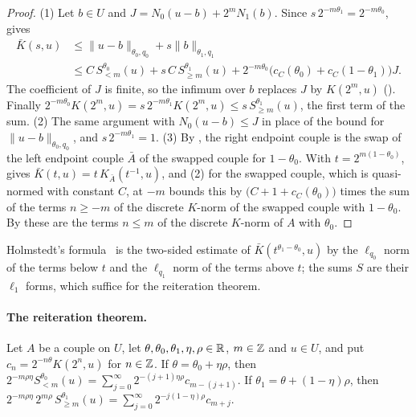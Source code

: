 \begin{proof}
\leanok
(1) Let $b \in U$ and $J = N_0(u - b) + 2^m N_1(b)$. Since $s \, 2^{-m\theta_1} =
2^{-m\theta_0}$,  gives
\begin{align*}
  \bar K(s, u) &\leq \|u - b\|_{\theta_0, q_0} + s \|b\|_{\theta_1, q_1} \\
  &\leq C \, S^{\theta_0}_{<m}(u) + s \, C \, S^{\theta_1}_{\geq m}(u)
    + 2^{-m\theta_0} \bigl(c_C(\theta_0) + c_C(1 - \theta_1)\bigr) J .
\end{align*}
The coefficient of $J$ is finite, so the infimum over $b$ replaces $J$ by $K(2^m, u)$
(). Finally
$2^{-m\theta_0} K(2^m, u) = s \, 2^{-m\theta_1} K(2^m, u) \leq s \, S^{\theta_1}_{\geq m}(u)$,
the first term of the sum. (2) The same argument with $N_0(u - b) \leq J$ in place of the
bound for $\|u - b\|_{\theta_0, q_0}$, and $s \, 2^{-m\theta_1} = 1$. (3) By
, the right endpoint couple is the swap of the left endpoint couple
$\bar A$ of the swapped couple for $1 - \theta_0$. With $t = 2^{m(1-\theta_0)}$,
 gives $\bar K(t, u) = t \, K_{\bar A}(t^{-1}, u)$, and (2)
for the swapped couple, which is quasi-normed with constant $C$, at $-m$ bounds this by
$\bigl(C + 1 + c_C(\theta_0)\bigr)$ times the sum of the terms $n \geq -m$ of the discrete
$K$-norm of the swapped couple with $1 - \theta_0$. By  these are
the terms $n \leq m$ of the discrete $K$-norm of $A$ with $\theta_0$.
\end{proof}

Holmstedt's formula~\cite[Theorem~3.6.1]{BerghLofstrom} is the two-sided estimate of
$\bar K(t^{\theta_1 - \theta_0}, u)$ by the $\ell_{q_0}$ norm of the terms below $t$ and the
$\ell_{q_1}$ norm of the terms above $t$; the sums $S$ are their $\ell_1$ forms, which suffice for
the reiteration theorem.

\paragraph{The reiteration theorem.}

\begin{lemma}
\label{lem:holmstedt-convolutions}
\leanok
{}
Let $A$ be a couple on $U$, let $\theta, \theta_0, \theta_1, \eta, \rho \in \mathbb{R}$, $m \in \mathbb{Z}$ and
$u \in U$, and put $c_n = 2^{-n\theta} K(2^n, u)$ for $n \in \mathbb{Z}$. If
$\theta = \theta_0 + \eta\rho$, then
$2^{-m\rho\eta} S^{\theta_0}_{<m}(u) = \sum_{j=0}^\infty 2^{-(j+1)\eta\rho} c_{m-(j+1)}$. If
$\theta_1 = \theta + (1 - \eta)\rho$, then
$2^{-m\rho\eta} \, 2^{m\rho} \, S^{\theta_1}_{\geq m}(u) = \sum_{j=0}^\infty
2^{-j(1-\eta)\rho} c_{m+j}$.
\end{lemma}

